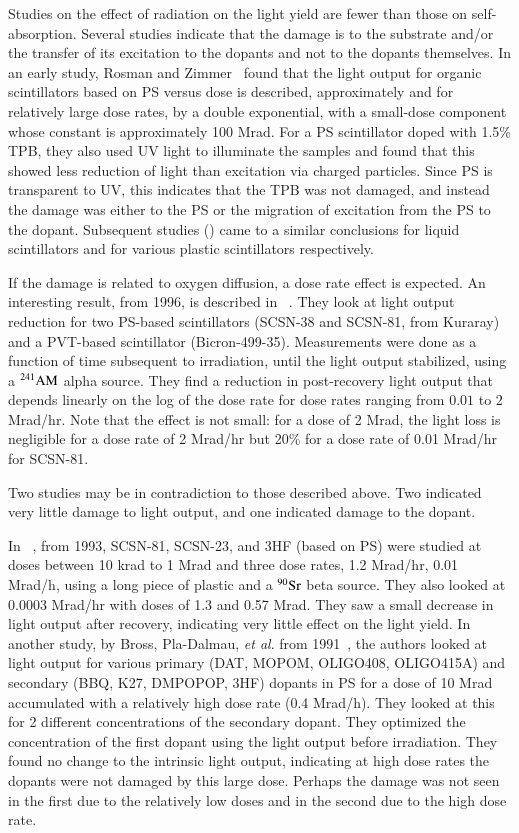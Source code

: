\documentclass[review]{elsarticle}
\begin{document}
Studies on the effect of radiation on the light yield are fewer
than those on self-absorption.
Several studies indicate that the damage is to the substrate
and/or the transfer of its excitation to the dopants and not to the
dopants themselves.
In an early study, Rosman and Zimmer~\cite{rosmanzimmer} found that the light
output for organic scintillators based on PS versus dose is described,
approximately and for relatively large dose rates, by a double exponential, 
with a small-dose component whose constant is approximately 100 Mrad.
For a PS scintillator doped with 1.5\% TPB, they also used UV light to illuminate
the samples  and found that this showed less
reduction of light than excitation via charged particles.
Since PS is transparent to UV, this
indicates that the TPB was not damaged, and instead the damage
was either to the PS or the migration of excitation from the PS
to the dopant.  Subsequent studies (\cite{berlman,173178,bros19921199}) came to a similar conclusions for
liquid scintillators and for various plastic scintillators respectively. 

If the damage is related to oxygen diffusion, a dose rate effect
is expected.
An interesting result, from 1996, is described in ~\cite{Biagtan1996125}.  They look at light output reduction for two
PS-based scintillators (SCSN-38 and SCSN-81, from Kuraray) and a
PVT-based scintillator (Bicron-499-35).  
Measurements were done as a function of time subsequent to irradiation, until the light output stabilized, using a ${\rm ^{241}AM}$ alpha source.
They find a reduction in post-recovery light output that depends linearly on the
log of the dose rate for dose rates ranging from $0.01$ to
$2$ Mrad/hr.  Note that the effect is not small: for a
dose of 2 Mrad, the light loss is negligible for a dose rate
of 2 Mrad/hr but 20\% for a dose rate of 0.01 Mrad/hr for SCSN-81.

Two studies may be in contradiction to those described above.
Two indicated very little damage to light output, and one indicated
damage to the dopant.

In ~\cite{Giokaris1993315}, from 1993, SCSN-81, SCSN-23, and 3HF (based on PS) were studied at doses between 10 krad to 1 Mrad and three dose rates, 1.2 Mrad/hr, 0.01 Mrad/h, using a long piece of plastic and a ${\rm ^{90}Sr}$ beta source.
They also looked at 0.0003 Mrad/hr with doses of 1.3 and 0.57 Mrad.
They saw a small decrease in light output after recovery, indicating
very little effect on the light yield.
In another study, by Bross, Pla-Dalmau, {\it et al}. from 1991~\cite{Bross199135}, the authors looked at light output for various 
primary (DAT, MOPOM, OLIGO408, OLIGO415A) and 
secondary (BBQ, K27, DMPOPOP, 3HF) dopants 
in PS
for a dose of 10 Mrad accumulated with a relatively high  dose rate (0.4 Mrad/h).  They looked at this for 2 different concentrations of the secondary dopant.  They optimized the concentration of the first dopant using the light output before irradiation.  They found no change to the intrinsic light output, indicating at high dose rates the dopants were
not damaged by this large dose.  
Perhaps the damage was not seen in the first due to the relatively low doses and in the second due to the high dose rate.
\end{document}
